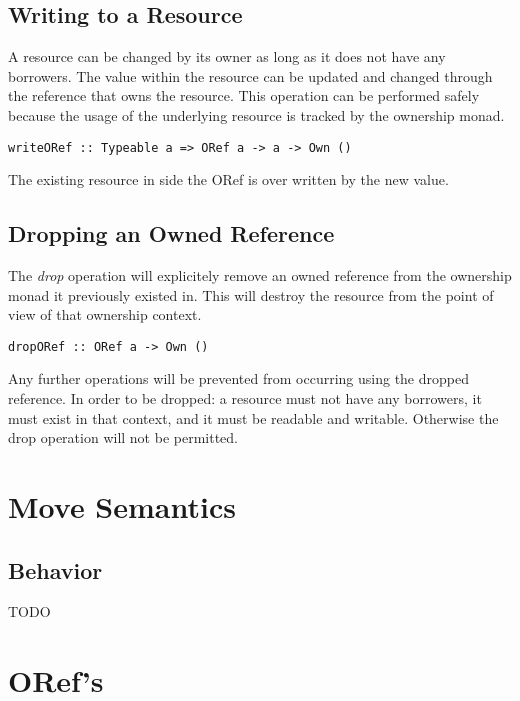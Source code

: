 \documentclass[onehalf,11pt]{beavtex}
\begin{document}

\subsection{Writing to a Resource}

A resource can be changed by its owner as long as it does not have any borrowers.
The value within the resource can be updated and changed through the reference
that owns the resource. This operation can be performed safely because the usage
of the underlying resource is tracked by the ownership monad.

\begin{verbatim}
writeORef :: Typeable a => ORef a -> a -> Own ()
\end{verbatim}

The existing resource in side the ORef is over written by the new value.

\subsection{Dropping an Owned Reference}

The \textit{drop} operation will explicitely remove an owned reference from the
ownership monad it previously existed in.
This will destroy the resource from the point of view of that ownership context.

\begin{verbatim}
dropORef :: ORef a -> Own ()
\end{verbatim}

Any further operations will be prevented from occurring using the dropped
reference. In order to be dropped: a resource must not have any borrowers,
it must exist in that context,
and it must be readable and writable.
Otherwise the drop operation will not be permitted.

\section{Move Semantics}

\subsection{Behavior}

TODO


\section{ORef's}
\end{document}

